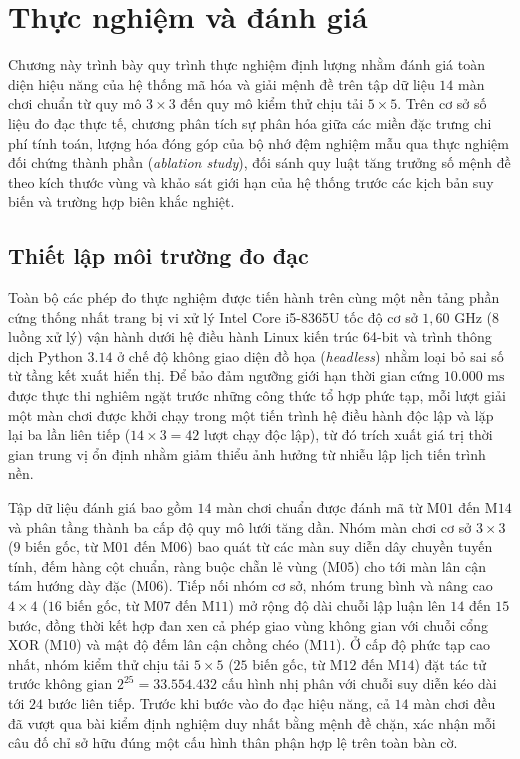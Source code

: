 \section{Thực nghiệm và đánh giá}
\label{sec:experiments}

Chương này trình bày quy trình thực nghiệm định lượng nhằm đánh giá toàn diện hiệu
năng của hệ thống mã hóa và giải mệnh đề trên tập dữ liệu $14$ màn chơi chuẩn từ
quy mô $3 \times 3$ đến quy mô kiểm thử chịu tải $5 \times 5$. Trên cơ sở số
liệu đo đạc thực tế, chương phân tích sự phân hóa giữa các miền đặc trưng chi phí
tính toán, lượng hóa đóng góp của bộ nhớ đệm nghiệm mẫu qua thực nghiệm đối chứng
thành phần (\textit{ablation study}), đối sánh quy luật tăng trưởng số mệnh đề theo kích thước vùng và khảo sát giới hạn của hệ thống trước các kịch bản
suy biến và trường hợp biên khắc nghiệt.

\subsection{Thiết lập môi trường đo đạc}
\label{subsec:exp_setup}
Toàn bộ các phép đo thực nghiệm được tiến hành trên cùng một nền tảng phần cứng
thống nhất trang bị vi xử lý Intel Core i5-8365U tốc độ cơ sở $1{,}60\text{ GHz}$
($8$ luồng xử lý) vận hành dưới hệ điều hành Linux kiến trúc 64-bit và trình thông
dịch Python $3.14$ ở chế độ không giao diện đồ họa (\textit{headless}) nhằm loại
bỏ sai số từ tầng kết xuất hiển thị. Để bảo đảm ngưỡng giới hạn thời gian cứng
$10.000\text{ ms}$ được thực thi nghiêm ngặt trước những công thức tổ hợp phức tạp,
mỗi lượt giải một màn chơi được khởi chạy trong một tiến trình hệ điều hành độc lập
và lặp lại ba lần liên tiếp ($14 \times 3 = 42$ lượt chạy độc lập), từ đó trích
xuất giá trị thời gian trung vị ổn định nhằm giảm thiểu ảnh hưởng từ nhiễu lập lịch
tiến trình nền.

Tập dữ liệu đánh giá bao gồm $14$ màn chơi chuẩn được đánh mã từ $\text{M01}$ đến
$\text{M14}$ và phân tầng thành ba cấp độ quy mô lưới tăng dần. Nhóm màn chơi cơ
sở $3 \times 3$ ($9$ biến gốc, từ $\text{M01}$ đến $\text{M06}$) bao quát từ các
màn suy diễn dây chuyền tuyến tính, đếm hàng cột chuẩn, ràng buộc chẵn lẻ vùng
($\text{M05}$) cho tới màn lân cận tám hướng dày đặc ($\text{M06}$). Tiếp nối nhóm
cơ sở, nhóm trung bình và nâng cao $4 \times 4$ ($16$ biến gốc, từ $\text{M07}$ đến
$\text{M11}$) mở rộng độ dài chuỗi lập luận lên $14$ đến $15$ bước, đồng thời kết
hợp đan xen cả phép giao vùng không gian với chuỗi cổng XOR ($\text{M10}$) và mật
độ đếm lân cận chồng chéo ($\text{M11}$). Ở cấp độ phức tạp cao nhất, nhóm kiểm
thử chịu tải $5 \times 5$ ($25$ biến gốc, từ $\text{M12}$ đến $\text{M14}$) đặt
tác tử trước không gian $2^{25} = 33.554.432$ cấu hình nhị phân với chuỗi suy diễn
kéo dài tới $24$ bước liên tiếp. Trước khi bước vào đo đạc hiệu năng, cả $14$ màn
chơi đều đã vượt qua bài kiểm định nghiệm duy nhất bằng mệnh đề chặn, xác nhận mỗi
câu đố chỉ sở hữu đúng một cấu hình thân phận hợp lệ trên toàn bàn cờ.

